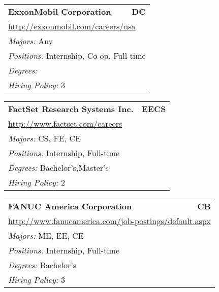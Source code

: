 \documentclass[twoside]{article}
\begin{document}
\begin{center}
\begin{multicols}{3}
\begin{FlushLeft}
\begin{minipage}{.9\columnwidth}
\end{minipage}
 
\begin{minipage}{.9\columnwidth}\begin{tabularx}{.95\columnwidth}{Xr}
                 {\Large\bf ExxonMobil Corporation} & {\Large\bf DC}\\
    \multicolumn{2}{p{.95\columnwidth}}{\url{http://exxonmobil.com/careers/usa}}\\
    \multicolumn{2}{p{.95\columnwidth}}{\emph{Majors:} Any}\\
    \multicolumn{2}{p{.95\columnwidth}}{\emph{Positions:} Internship, Co-op, Full-time}\\
    \multicolumn{2}{p{.95\columnwidth}}{\emph{Degrees:} }\\
    \multicolumn{2}{p{.95\columnwidth}}{\emph{Hiring Policy:} 3}\\
    \end{tabularx}
    
\end{minipage}
 
\begin{minipage}{.9\columnwidth}\begin{tabularx}{.95\columnwidth}{Xr}
                 {\Large\bf FactSet Research Systems Inc.} & {\Large\bf EECS}\\
    \multicolumn{2}{p{.95\columnwidth}}{\url{http://www.factset.com/careers}}\\
    \multicolumn{2}{p{.95\columnwidth}}{\emph{Majors:} CS, FE, CE}\\
    \multicolumn{2}{p{.95\columnwidth}}{\emph{Positions:} Internship, Full-time}\\
    \multicolumn{2}{p{.95\columnwidth}}{\emph{Degrees:} Bachelor's,Master's}\\
    \multicolumn{2}{p{.95\columnwidth}}{\emph{Hiring Policy:} 2}\\
    \end{tabularx}
    
\end{minipage}
 
\begin{minipage}{.9\columnwidth}\begin{tabularx}{.95\columnwidth}{Xr}
                 {\Large\bf FANUC America Corporation} & {\Large\bf CB}\\
    \multicolumn{2}{p{.95\columnwidth}}{\url{http://www.fanucamerica.com/job-postings/default.aspx}}\\
    \multicolumn{2}{p{.95\columnwidth}}{\emph{Majors:} ME, EE, CE}\\
    \multicolumn{2}{p{.95\columnwidth}}{\emph{Positions:} Internship, Full-time}\\
    \multicolumn{2}{p{.95\columnwidth}}{\emph{Degrees:} Bachelor's}\\
    \multicolumn{2}{p{.95\columnwidth}}{\emph{Hiring Policy:} 3}\\
    \end{tabularx}
    

\end{minipage}
\end{FlushLeft}
\end{multicols}
\end{center}
\end{document}
